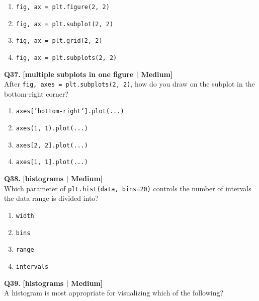 \begin{enumerate}[label=(\alph*),topsep=2pt,itemsep=1pt,partopsep=0pt,parsep=0pt]
    \item \relax \texttt{fig, ax = plt.figure(2, 2)}
    \item \relax \texttt{fig, ax = plt.subplot(2, 2)}
    \item \relax \texttt{fig, ax = plt.grid(2, 2)}
    \item \relax \texttt{fig, ax = plt.subplots(2, 2)}
\end{enumerate}
\vspace{2mm}

\noindent\textbf{Q37.} \hfill {\small\color{LPUOrange}\textbf{[multiple subplots in one figure | Medium]}}\\[2pt]
After \texttt{fig, axes = plt.subplots(2, 2)}, how do you draw on the subplot in the bottom-right corner?

\begin{enumerate}[label=(\alph*),topsep=2pt,itemsep=1pt,partopsep=0pt,parsep=0pt]
    \item \relax \texttt{axes['bottom-right'].plot(...)}
    \item \relax \texttt{axes(1, 1).plot(...)}
    \item \relax \texttt{axes[2, 2].plot(...)}
    \item \relax \texttt{axes[1, 1].plot(...)}
\end{enumerate}
\vspace{2mm}

\noindent\textbf{Q38.} \hfill {\small\color{LPUOrange}\textbf{[histograms | Medium]}}\\[2pt]
Which parameter of \texttt{plt.hist(data, bins=20)} controls the number of intervals the data range is divided into?

\begin{enumerate}[label=(\alph*),topsep=2pt,itemsep=1pt,partopsep=0pt,parsep=0pt]
    \item \relax \texttt{width}
    \item \relax \texttt{bins}
    \item \relax \texttt{range}
    \item \relax \texttt{intervals}
\end{enumerate}
\vspace{2mm}

\noindent\textbf{Q39.} \hfill {\small\color{LPUOrange}\textbf{[histograms | Medium]}}\\[2pt]
A histogram is most appropriate for visualizing which of the following?

